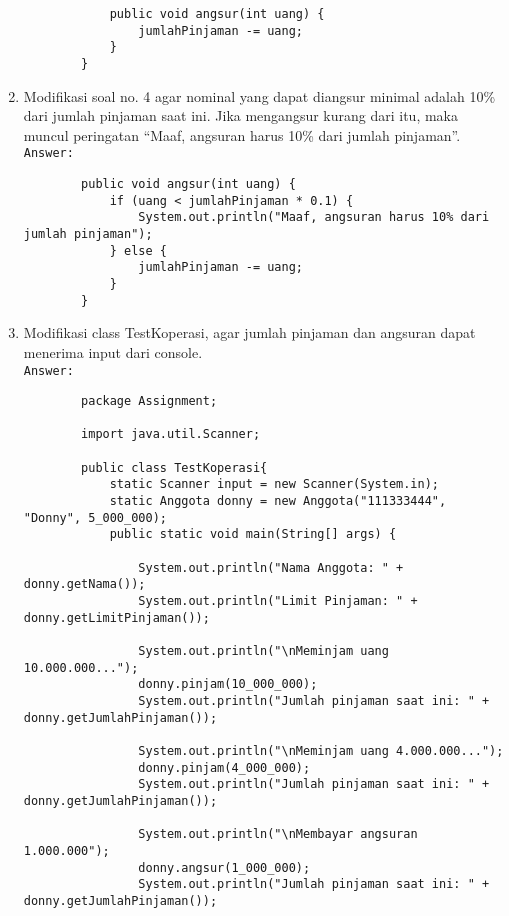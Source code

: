 \documentclass[12pt,titlepage]{article}
\begin{document}
\begin{enumerate}
\begin{verbatim}
            public void angsur(int uang) {
                jumlahPinjaman -= uang;
            }
        }

    \end{verbatim}
    \item Modifikasi soal no. 4 agar nominal yang dapat diangsur minimal adalah 10\% dari jumlah pinjaman saat ini. Jika mengangsur kurang dari itu, maka muncul peringatan “Maaf, angsuran harus 10\% dari jumlah pinjaman”. \\ 
    \texttt{Answer:} 
    \begin{verbatim}
        public void angsur(int uang) {
            if (uang < jumlahPinjaman * 0.1) {
                System.out.println("Maaf, angsuran harus 10% dari jumlah pinjaman");
            } else {
                jumlahPinjaman -= uang;
            }
        }
    \end{verbatim}
    \item Modifikasi class TestKoperasi, agar jumlah pinjaman dan angsuran dapat menerima input dari console. \\ 
    \texttt{Answer:} 
    \begin{verbatim}
        package Assignment;

        import java.util.Scanner;

        public class TestKoperasi{
            static Scanner input = new Scanner(System.in);
            static Anggota donny = new Anggota("111333444", "Donny", 5_000_000);
            public static void main(String[] args) {
                
                System.out.println("Nama Anggota: " + donny.getNama());
                System.out.println("Limit Pinjaman: " + donny.getLimitPinjaman());
                
                System.out.println("\nMeminjam uang 10.000.000...");
                donny.pinjam(10_000_000);
                System.out.println("Jumlah pinjaman saat ini: " + donny.getJumlahPinjaman());
                
                System.out.println("\nMeminjam uang 4.000.000...");
                donny.pinjam(4_000_000);
                System.out.println("Jumlah pinjaman saat ini: " + donny.getJumlahPinjaman());
                
                System.out.println("\nMembayar angsuran 1.000.000");
                donny.angsur(1_000_000);
                System.out.println("Jumlah pinjaman saat ini: " + donny.getJumlahPinjaman());


\end{verbatim}
\end{enumerate}
\end{document}
